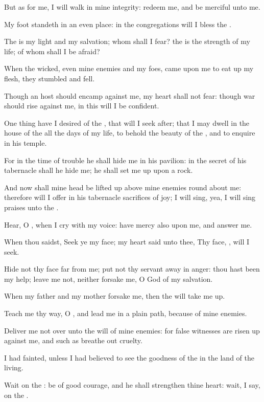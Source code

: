 \Verse But as for me, I will walk in mine integrity: redeem me, and be merciful unto me.

\Verse My foot standeth in an even place: in the congregations will I bless the \LORD.




\Chapter
\Verse The \LORD is my light and my salvation; whom shall I fear? the \LORD is the strength of my life; of whom shall I be afraid?

\Verse When the wicked, even mine enemies and my foes, came upon me to eat up my flesh, they stumbled and fell.

\Verse Though an host should encamp against me, my heart shall not fear: though war should rise against me, in this will I be confident.

\Verse One thing have I desired of the \LORD, that will I seek after; that I may dwell in the house of the \LORD all the days of my life, to behold the beauty of the \LORD, and to enquire in his temple.

\Verse For in the time of trouble he shall hide me in his pavilion: in the secret of his tabernacle shall he hide me; he shall set me up upon a rock.

\Verse And now shall mine head be lifted up above mine enemies round about me: therefore will I offer in his tabernacle sacrifices of joy; I will sing, yea, I will sing praises unto the \LORD.

\Verse Hear, O \LORD, when I cry with my voice: have mercy also upon me, and answer me.

\Verse When thou saidst, Seek ye my face; my heart said unto thee, Thy face, \LORD, will I seek.

\Verse Hide not thy face far from me; put not thy servant away in anger: thou hast been my help; leave me not, neither forsake me, O God of my salvation.

\Verse When my father and my mother forsake me, then the \LORD will take me up.

\Verse Teach me thy way, O \LORD, and lead me in a plain path, because of mine enemies.

\Verse Deliver me not over unto the will of mine enemies: for false witnesses are risen up against me, and such as breathe out cruelty.

\Verse I had fainted, unless I had believed to see the goodness of the \LORD in the land of the living.

\Verse Wait on the \LORD: be of good courage, and he shall strengthen thine heart: wait, I say, on the \LORD.




